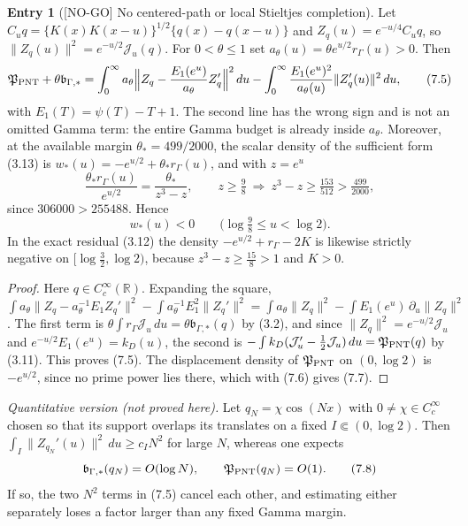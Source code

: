\documentclass[11pt]{amsart}
\theoremstyle{definition}
\newcounter{family}
\newtheorem{entry}{Entry}[family]
\theoremstyle{remark}
\newcommand{\R}{\mathbb R}
\newcommand{\dd}{\,d}
\newcommand{\NOGO}{\textup{[NO-GO]}}
\begin{document}
\begin{entry}[\NOGO{} No centered-path or local Stieltjes completion]
\label{ent:C5}
Let \(C_uq=\{K(x)K(x-u)\}^{1/2}\{q(x)-q(x-u)\}\) and
\(Z_q(u)=e^{-u/4}C_uq\), so \(\|Z_q(u)\|^2=e^{-u/2}\mathcal J_u(q)\).  For
\(0<\theta\le1\) set \(a_\theta(u)=\theta e^{u/2}r_\Gamma(u)>0\).  Then
\[
 \mathfrak P_{\rm PNT}+\theta\mathfrak b_{\Gamma,*}
 =\int_0^\infty a_\theta\Bigl\|Z_q-\frac{E_1(e^u)}{a_\theta}Z_q'\Bigr\|^2\dd u
 -\int_0^\infty\frac{E_1(e^u)^2}{a_\theta(u)}\|Z_q'(u)\|^2\dd u ,
\tag{7.5}
\]
with \(E_1(T)=\psi(T)-T+1\).  The second line has the wrong sign and is
not an omitted Gamma term: the entire Gamma budget is already inside
\(a_\theta\).  Moreover, at the available margin \(\theta_*=499/2000\),
the scalar density of the sufficient form (3.13) is
\(w_*(u)=-e^{u/2}+\theta_*r_\Gamma(u)\), and with \(z=e^u\)
\[
 \frac{\theta_*r_\Gamma(u)}{e^{u/2}}=\frac{\theta_*}{z^3-z},
 \qquad
 z\ge\tfrac98\ \Longrightarrow\ z^3-z\ge\tfrac{153}{512}>\tfrac{499}{2000},
\tag{7.6}
\]
since \(306000>255488\).  Hence
\[
 \boxed{w_*(u)<0\qquad\bigl(\log\tfrac98\le u<\log2\bigr).}
\tag{7.7}
\]
In the exact residual (3.12) the density \(-e^{u/2}+r_\Gamma-2K\) is
likewise strictly negative on \([\log\frac32,\log2)\), because
\(z^3-z\ge\frac{15}8>1\) and \(K>0\).
\end{entry}

\begin{proof}
Here \(q\in C_c^\infty(\R)\).  Expanding the square,
\(\int a_\theta\|Z_q-a_\theta^{-1}E_1Z_q'\|^2-\int a_\theta^{-1}E_1^2\|Z_q'\|^2
=\int a_\theta\|Z_q\|^2-\int E_1(e^u)\,\partial_u\|Z_q\|^2\).  The first
term is \(\theta\int r_\Gamma\mathcal J_u\dd u=\theta\mathfrak b_{\Gamma,*}(q)\)
by (3.2), and since \(\|Z_q\|^2=e^{-u/2}\mathcal J_u\) and
\(e^{-u/2}E_1(e^u)=k_D(u)\), the second is
\(-\int k_D(\mathcal J_u'-\frac12\mathcal J_u)\dd u=\mathfrak P_{\rm PNT}(q)\)
by (3.11).  This proves (7.5).  The displacement density of
\(\mathfrak P_{\rm PNT}\) on \((0,\log2)\) is \(-e^{u/2}\), since no prime
power lies there, which with (7.6) gives (7.7).
\end{proof}

\emph{Quantitative version (not proved here).}  Let \(q_N=\chi\cos(Nx)\) with
\(0\ne\chi\in C_c^\infty\) chosen so that its support overlaps its
translates on a fixed \(I\Subset(0,\log2)\).  Then
\(\int_I\|Z_{q_N}'(u)\|^2\dd u\ge c_IN^2\) for large \(N\), whereas
one expects
\[
 \mathfrak b_{\Gamma,*}(q_N)=O(\log N),
 \qquad
 \mathfrak P_{\rm PNT}(q_N)=O(1).
\tag{7.8}
\]
If so, the two \(N^2\) terms in (7.5) cancel each other, and estimating
either separately loses a factor larger than any fixed Gamma margin.
\end{document}
